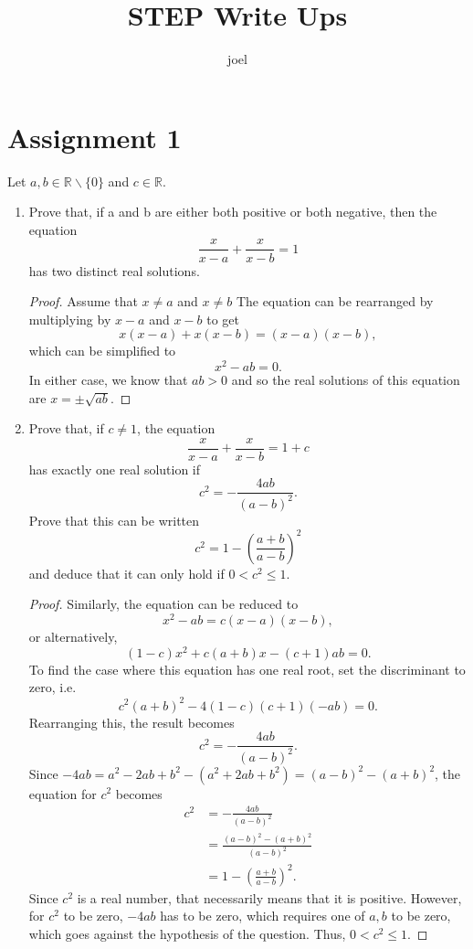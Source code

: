 \documentclass[10pt]{article}
\title{STEP Write Ups}
\author{joel}
\date{}
\theoremstyle{definition}
\theoremstyle{remark}
\newcommand{\R}{\mathbb{R}}
\begin{document}
\maketitle

\section*{Assignment 1}

Let $a, b \in \R \backslash \{0\}$ and $c \in \R$.

\begin{enumerate}[label=(\roman*)]
    \item Prove that, if a and b are either both positive or both negative, then
        the equation \[ \frac{x}{x - a} + \frac{x}{x - b} = 1 \] has two
        distinct real solutions.
    \begin{proof}
        Assume that $x \neq a$ and $x \neq b$ The equation can be rearranged by multiplying
        by $x - a$ and $x - b$ to get \[ x(x -a) + x(x - b) = (x - a)(x - b), \]
        which can be simplified to \[ x^2 - ab = 0. \]
        In either case, we know that $ab > 0$ and so the real solutions of this
        equation are $x = \pm \sqrt{ab}$.
    \end{proof}
    \item Prove that, if $c \neq 1$, the equation
        \[  \frac{x}{x - a} + \frac{x}{x - b} = 1 + c \]
        has exactly one real solution if
        \[ c^2 = -\frac{4ab}{(a-b)^2}. \]
        Prove that this can be written
        \[ c^2 = 1 - \left( \frac{a + b}{a - b} \right)^2 \]
        and deduce that it can only hold if $0 < c^2 \leq 1.$
    \begin{proof}
        Similarly, the equation can be reduced to
        \[ x^2 - ab = c(x - a)(x - b), \] or alternatively,
        \[ (1 - c)x^2 + c(a + b)x - (c + 1)ab = 0. \]
        To find the case where this equation has one real root, set the
        discriminant to zero, i.e.
        \[ c^2(a+b)^2 - 4 (1-c) (c + 1) ( -ab) = 0. \]
        Rearranging this, the result becomes
        \[  c^2 = -\frac{4ab}{(a-b)^2}. \]
        Since $-4ab = a^2 - 2ab + b^2 - (a^2 + 2ab + b^2) = (a-b)^2 - (a+b)^2$,
        the equation for $c^2$ becomes
        \begin{align*}
            c^2 &= -\frac{4ab}{(a-b)^2} \\
                &= \frac{(a - b)^2 - (a + b)^2}{(a - b)^2} \\
                &=1 - \left( \frac{a + b}{a - b} \right)^2.
        \end{align*}
        Since $c^2$ is a real number, that necessarily means that it is positive.
        However, for $c^2$ to be zero, $-4ab$ has to be zero, which requires one
        of $a, b$ to be zero, which goes against the hypothesis of the question.
        Thus, $0 < c^2 \leq 1$.
    \end{proof}
\end{enumerate}
\end{document}
